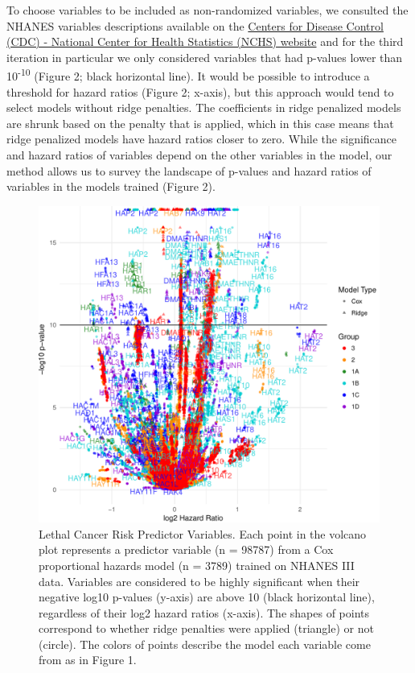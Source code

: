 \documentclass[12pt,oneside]{reedthesis}
\theoremstyle{definition}
\theoremstyle{definition}
\theoremstyle{definition}
\theoremstyle{remark}
\begin{document}
To choose variables to be included as non-randomized variables, we
consulted the NHANES variables descriptions available on the
\href{https://wwwn.cdc.gov/nchs/nhanes/nhanes3/DataFiles.aspx}{Centers
for Disease Control (CDC) - National Center for Health Statistics (NCHS)
website} and for the third iteration in particular we only considered
variables that had p-values lower than 10\textsuperscript{-10} (Figure
2; black horizontal line). It would be possible to introduce a threshold
for hazard ratios (Figure 2; x-axis), but this approach would tend to
select models without ridge penalties. The coefficients in ridge
penalized models are shrunk based on the penalty that is applied, which
in this case means that ridge penalized models have hazard ratios closer
to zero. While the significance and hazard ratios of variables depend on
the other variables in the model, our method allows us to survey the
landscape of p-values and hazard ratios of variables in the models
trained (Figure 2).
\begin{figure}
\centering
\includegraphics[width=\textwidth,height=0.6\textheight]{figure/2-volcano-final.pdf}
\caption{Lethal Cancer Risk Predictor Variables. \break Each point in
the volcano plot represents a predictor variable (n = 98787) from a Cox
proportional hazards model (n = 3789) trained on NHANES III data.
Variables are considered to be highly significant when their negative
log10 p-values (y-axis) are above 10 (black horizontal line), regardless
of their log2 hazard ratios (x-axis). The shapes of points correspond to
whether ridge penalties were applied (triangle) or not (circle). The
colors of points describe the model each variable come from as in Figure
1.}
\end{figure}
\end{document}
